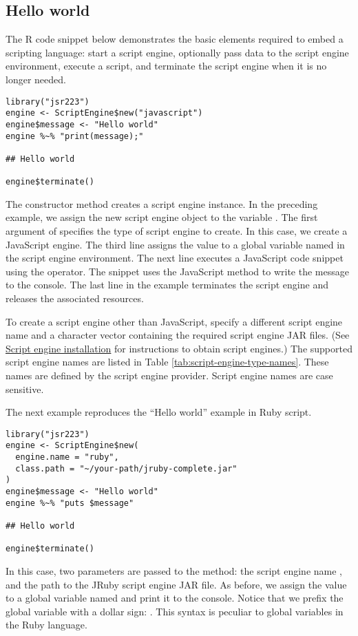 \subsection{Hello world}

The R code snippet below demonstrates the basic elements required to embed a scripting language: start a script engine, optionally pass data to the script engine environment, execute a script, and terminate the script engine when it is no longer needed.

\begin{verbatim}
library("jsr223")
engine <- ScriptEngine$new("javascript")
engine$message <- "Hello world"
engine %~% "print(message);"

## Hello world

engine$terminate()
\end{verbatim}

The  constructor method creates a script engine instance. In the preceding example, we assign the new script engine object to the variable . The first argument of  specifies the type of script engine to create. In this case, we create a JavaScript engine. The third line assigns the value  to a global variable named  in the script engine environment. The next line executes a JavaScript code snippet using the \code{\%$\sim$\%} operator. The snippet uses the JavaScript  method to write the message to the console. The last line in the example terminates the script engine and releases the associated resources.

To create a script engine other than JavaScript, specify a different script engine name and a character vector containing the required script engine JAR files. (See \hyperlink{scriptengineinstallation}{Script engine installation} for instructions to obtain script engines.) The supported script engine names are listed in Table \ref{tab:script-engine-type-names}. These names are defined by the script engine provider.  Script engine names are case sensitive.

The next example reproduces the “Hello world” example in Ruby script.

\begin{verbatim}
library("jsr223")
engine <- ScriptEngine$new(
  engine.name = "ruby",
  class.path = "~/your-path/jruby-complete.jar"
)
engine$message <- "Hello world"
engine %~% "puts $message"

## Hello world

engine$terminate()
\end{verbatim}
In this case, two parameters are passed to the  method: the script engine name , and the path to the JRuby script engine JAR file. As before, we assign the value  to a global variable named  and print it to the console. Notice that we prefix the global variable with a dollar sign: . This syntax is peculiar to global variables in the Ruby language.

